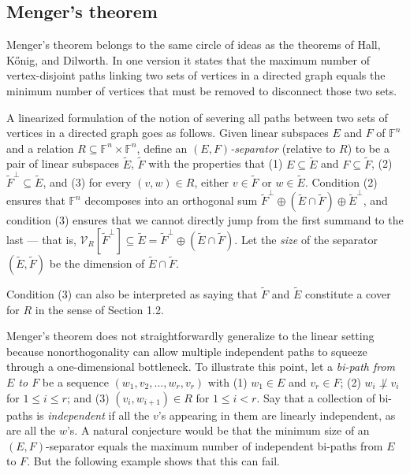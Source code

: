 \documentclass{amsart}
\theoremstyle{definition}
\begin{document}
\subsection{Menger's theorem}

Menger's theorem belongs to the same circle of ideas as the theorems of Hall, Kőnig, and Dilworth. In one version it states that the maximum number of vertex-disjoint paths linking two sets of vertices in a directed graph equals the minimum number of vertices that must be removed to disconnect those two sets.

A linearized formulation of the notion of severing all paths between two sets of vertices in a directed graph goes as follows. Given linear subspaces $E$ and $F$ of $\mathbb{F}^n$ and a relation $R \subseteq \mathbb{F}^n \times \mathbb{F}^n$, define an {\it $(E,F)$-separator} (relative to $R$) to be a pair of linear subspaces $\tilde{E}$, $\tilde{F}$ with the properties that (1) $E \subseteq \tilde{E}$ and $F \subseteq \tilde{F}$, (2) $\tilde{F}^\perp \subseteq \tilde{E}$, and (3) for every $(v,w) \in R$, either $v \in \tilde{F}$ or $w \in \tilde{E}$. Condition (2) ensures that $\mathbb{F}^n$ decomposes into an orthogonal sum $\tilde{F}^\perp \oplus (\tilde{E} \cap \tilde{F}) \oplus \tilde{E}^\perp$, and condition (3) ensures that we cannot directly jump from the first summand to the last --- that is, $\mathcal{V}_R[\tilde{F}^\perp] \subseteq \tilde{E} = \tilde{F}^\perp \oplus (\tilde{E} \cap \tilde{F})$. Let the {\it size} of the separator $(\tilde{E}, \tilde{F})$ be the dimension of $\tilde{E} \cap \tilde{F}$.

Condition (3) can also be interpreted as saying that $\tilde{F}$ and $\tilde{E}$ constitute a cover for $R$ in the sense of Section 1.2.

Menger's theorem does not straightforwardly generalize to the linear setting because nonorthogonality can allow multiple independent paths to squeeze through a one-dimensional bottleneck. To illustrate this point, let a {\it bi-path from $E$ to $F$} be a sequence $(w_1, v_2, \ldots, w_r, v_r)$ with (1) $w_1 \in E$ and $v_r \in F$; (2) $w_i \not\perp v_i$ for $1 \leq i \leq r$; and (3) $(v_i, w_{i+1}) \in R$ for $1 \leq i < r$. Say that a collection of bi-paths is {\it independent} if all the $v$'s appearing in them are linearly independent, as are all the $w$'s. A natural conjecture would be that the minimum size of an $(E,F)$-separator equals the maximum number of independent bi-paths from $E$ to $F$. But the following example shows that this can fail.
\end{document}
